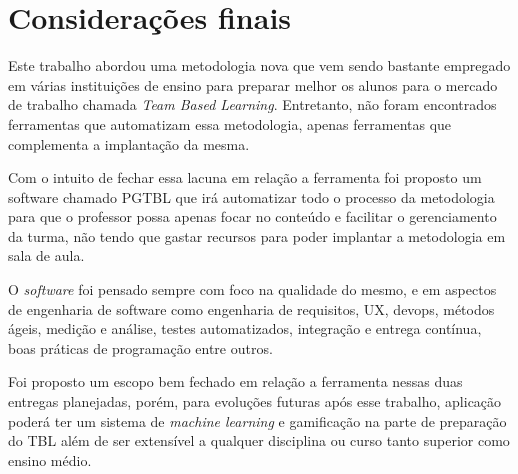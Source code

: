 \chapter{Considerações finais}

Este trabalho abordou uma metodologia nova que vem sendo bastante empregado em várias instituições de ensino para preparar melhor os alunos para o mercado de trabalho chamada \textit{Team Based Learning}. Entretanto, não foram encontrados ferramentas que automatizam essa metodologia, apenas ferramentas que complementa a implantação da mesma.

Com o intuito de fechar essa lacuna em relação a ferramenta foi proposto um software chamado PGTBL que irá automatizar todo o processo da metodologia para que o professor possa apenas focar no conteúdo e facilitar o gerenciamento da turma, não tendo que gastar recursos para poder implantar a metodologia em sala de aula.

O \textit{software} foi pensado sempre com foco na qualidade do mesmo, e em aspectos de engenharia de software como engenharia de requisitos, UX, devops, métodos ágeis, medição e análise, testes automatizados, integração e entrega contínua, boas práticas de programação entre outros.

Foi proposto um escopo bem fechado em relação a ferramenta nessas duas entregas planejadas, porém, para evoluções futuras após esse trabalho, aplicação poderá ter um sistema de \textit{machine learning} e gamificação na parte de preparação do TBL além de ser extensível a qualquer disciplina ou curso tanto superior como ensino médio.
